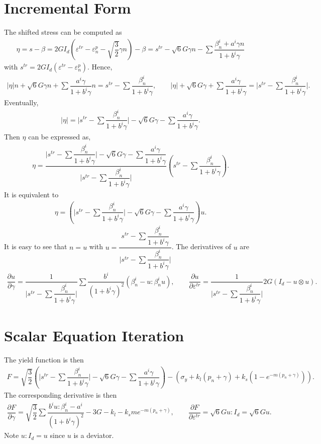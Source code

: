 \documentclass[a4paper,10pt,fleqn]{article}
\newcommand*{\pfrac}[2]{\dfrac{\partial#1}{\partial#2}}
\begin{document}
\section{Incremental Form}
The shifted stress can be computed as
\begin{gather}
\eta=s-\beta=2GI_d\left(\varepsilon^{tr}-\varepsilon^p_n-\sqrt{\dfrac{3}{2}}\gamma{}n\right)-\beta=s^{tr}-\sqrt{6}G\gamma{}n-\sum\dfrac{\beta_n^i+a^i\gamma{}n}{1+b^i\gamma}
\end{gather}
with $s^{tr}=2GI_d\left(\varepsilon^{tr}-\varepsilon^p_n\right)$. Hence,
\begin{gather*}
\Big|\eta\Big|n+\sqrt{6}G\gamma{}n+\sum\dfrac{a^i\gamma}{1+b^i\gamma}n=s^{tr}-\sum\dfrac{\beta_n^i}{1+b^i\gamma},\qquad
\Big|\eta\Big|+\sqrt{6}G\gamma+\sum\dfrac{a^i\gamma}{1+b^i\gamma}=\Big|s^{tr}-\sum\dfrac{\beta_n^i}{1+b^i\gamma}\Big|.
\end{gather*}
Eventually,
\begin{gather}
\Big|\eta\Big|=\Big|s^{tr}-\sum\dfrac{\beta_n^i}{1+b^i\gamma}\Big|-\sqrt{6}G\gamma-\sum\dfrac{a^i\gamma}{1+b^i\gamma}.
\end{gather}
Then $\eta$ can be expressed as,
\begin{gather*}
\eta=\dfrac{\Big|s^{tr}-\sum\dfrac{\beta_n^i}{1+b^i\gamma}\Big|-\sqrt{6}G\gamma-\sum\dfrac{a^i\gamma}{1+b^i\gamma}}{\Big|s^{tr}-\sum\dfrac{\beta_n^i}{1+b^i\gamma}\Big|}\left(s^{tr}-\sum\dfrac{\beta_n^i}{1+b^i\gamma}\right).
\end{gather*}
It is equivalent to
\begin{gather*}
\eta=\left(\Big|s^{tr}-\sum\dfrac{\beta_n^i}{1+b^i\gamma}\Big|-\sqrt{6}G\gamma-\sum\dfrac{a^i\gamma}{1+b^i\gamma}\right)u.
\end{gather*}
It is easy to see that $n=u$ with $\displaystyle{}u=\dfrac{s^{tr}-\sum\dfrac{\beta_n^i}{1+b^i\gamma}}{\Big|s^{tr}-\sum\dfrac{\beta_n^i}{1+b^i\gamma}\Big|}$. The derivatives of $u$ are
\begin{gather}
\pfrac{u}{\gamma}=\dfrac{1}{\Big|s^{tr}-\sum\dfrac{\beta_n^i}{1+b^i\gamma}\Big|}\sum\dfrac{b^i}{(1+b^i\gamma)^2}\left(\beta_n^i-u:\beta_n^iu\right),\qquad
\pfrac{u}{\varepsilon^{tr}}=\dfrac{1}{\Big|s^{tr}-\sum\dfrac{\beta_n^i}{1+b^i\gamma}\Big|}2G\left(I_d-u\otimes{}u\right).
\end{gather}
\section{Scalar Equation Iteration}
The yield function is then
\begin{gather}
F=\sqrt{\dfrac{3}{2}}\left(\Big|s^{tr}-\sum\dfrac{\beta_n^i}{1+b^i\gamma}\Big|-\sqrt{6}G\gamma-\sum\dfrac{a^i\gamma}{1+b^i\gamma}\right)-\left(\sigma_y+k_l\left(p_n+\gamma\right)+k_s\left(1-e^{-m\left(p_n+\gamma\right)}\right)\right).
\end{gather}
The corresponding derivative is then
\begin{gather}
\pfrac{F}{\gamma}=\sqrt{\dfrac{3}{2}}\sum\dfrac{b^iu:\beta_n^i-a^i}{(1+b^i\gamma)^2}-3G-k_l-k_sme^{-m\left(p_n+\gamma\right)},\qquad
\pfrac{F}{\varepsilon^{tr}}=\sqrt{6}Gu:I_d=\sqrt{6}Gu.
\end{gather}
Note $u:I_d=u$ since $u$ is a deviator.
\end{document}
